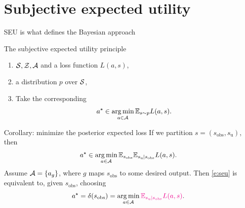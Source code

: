\documentclass[10pt]{beamer}
\begin{document}
        

\section{Subjective expected utility}
\begin{frame}{SEU is what defines the Bayesian approach}
\begin{block}{The subjective expected utility principle}
\begin{enumerate}
\item {} $\mathcal{S}, \mathcal{Z}, \mathcal{A}$ and a loss function $L(a,s)$,
\item {} a distribution $p$ over $\mathcal{S}$,
\item Take the corresponding 
\begin{equation}
a^\star \in \operatorname*{arg\,min}_{a\in\mathcal{A}} \mathbb{E}_{s\sim p} L(a,s).
\label{e:seu}
\end{equation}
\end{enumerate}
\end{block}
\vfill

\begin{exampleblock}{Corollary: minimize the posterior expected loss}
If we partition $s=(s_{\text{obs}}, s_{\text{u}})$, then
$$ a^\star \in \operatorname*{arg\,min}_{a\in\mathcal{A}} \mathbb{E}_{s_{\text{obs}}} \mathbb{E}_{s_{\text{u}}\vert s_{\text{obs}}} L(a,s).$$
Assume $\mathcal{A} = \{a_g\}$, where $g$ maps $s_{\text{obs}}$ to some desired output. Then \eqref{e:seu} is equivalent to, given $s_{\text{obs}}$, choosing
$$
a^\star = \delta(s_{\text{obs}}) = \operatorname*{arg\,min}_{a\in\mathcal{A}} \textcolor{magenta}{\mathbb{E}_{s_{\text{u}}\vert s_{\text{obs}}} L(a,s)}.$$
\end{exampleblock}
\end{frame}
\end{document}
